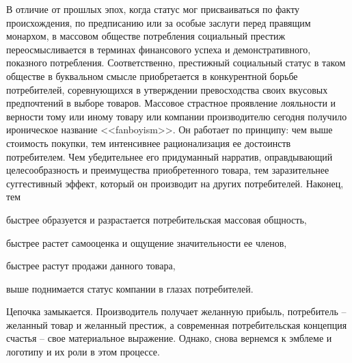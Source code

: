 В отличие от прошлых эпох, когда статус мог присваиваться по факту происхождения,
по предписанию или за особые заслуги перед правящим монархом, в массовом обществе
потребления социальный престиж переосмысливается в терминах финансового успеха и
демонстративного, показного потребления. Соответственно, престижный социальный статус
в таком обществе в буквальном смысле приобретается в конкурентной борьбе потребителей,
соревнующихся в утверждении превосходства своих вкусовых предпочтений в выборе товаров.
Массовое страстное проявление лояльности и верности тому или иному товару или компании
производителю сегодня получило ироническое название
<<fanboyism>>.\autocite{mcraney2011you}
Он работает по принципу: чем выше стоимость покупки, тем интенсивнее рационализация
ее достоинств потребителем. Чем убедительнее его придуманный нарратив, оправдывающий
целесообразность и преимущества приобретенного товара, тем заразительнее
суггестивный эффект, который он производит на других потребителей. Наконец, тем
\begin{enumerate*}[label=\asbuk*)]
\item быстрее образуется и разрастается потребительская массовая общность,
\item быстрее растет самооценка и ощущение значительности ее членов,
\item быстрее растут продажи данного товара,
\item выше поднимается статус компании в глазах потребителей.
\end{enumerate*}
Цепочка замыкается. Производитель получает желанную прибыль, потребитель --
желанный товар и желанный престиж, а современная потребительская концепция счастья --
свое материальное выражение. \autocite[][15-23]{lebedev2012} Однако, снова вернемся к эмблеме и логотипу и их
роли в этом процессе.

